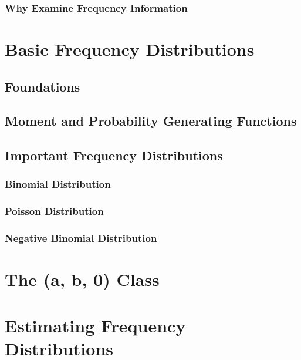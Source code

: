 \documentclass[]{book}
\theoremstyle{definition}
\theoremstyle{definition}
\theoremstyle{definition}
\theoremstyle{remark}
\begin{document}
\subsubsection{Why Examine Frequency
Information}\label{S:why-examine-frequency-information}

\section{Basic Frequency
Distributions}\label{S:basic-frequency-distributions}

\subsection{Foundations}\label{S:foundations}

\subsection{Moment and Probability Generating
Functions}\label{S:generating-functions}

\subsection{Important Frequency
Distributions}\label{S:important-frequency-distributions}

\subsubsection{Binomial Distribution}\label{S:binomial-distribution}

\subsubsection{Poisson Distribution}\label{S:poisson-distribution}

\subsubsection{Negative Binomial
Distribution}\label{S:negative-binomial-distribution}

\section{The (a, b, 0) Class}\label{S:the-a-b-0-class}

\section{Estimating Frequency
Distributions}\label{S:estimating-frequency-distributions}
\end{document}

